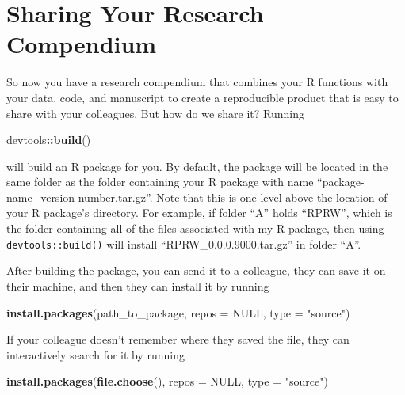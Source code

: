 \documentclass[
]{book}
\newenvironment{Shaded}{\begin{snugshade}}{\end{snugshade}}
\newcommand{\DataTypeTok}[1]{\textcolor[rgb]{0.13,0.29,0.53}{#1}}
\newcommand{\KeywordTok}[1]{\textcolor[rgb]{0.13,0.29,0.53}{\textbf{#1}}}
\newcommand{\NormalTok}[1]{#1}
\newcommand{\OperatorTok}[1]{\textcolor[rgb]{0.81,0.36,0.00}{\textbf{#1}}}
\newcommand{\OtherTok}[1]{\textcolor[rgb]{0.56,0.35,0.01}{#1}}
\newcommand{\StringTok}[1]{\textcolor[rgb]{0.31,0.60,0.02}{#1}}
\begin{document}
\hypertarget{sharing-rc}{%
\section{Sharing Your Research Compendium}\label{sharing-rc}}

So now you have a research compendium that combines your R functions with your data, code, and manuscript to create a reproducible product that is easy to share with your colleagues. But how do we share it? Running

\begin{Shaded}
\begin{Highlighting}[]
\NormalTok{devtools}\OperatorTok{::}\KeywordTok{build}\NormalTok{()}
\end{Highlighting}
\end{Shaded}

will build an R package for you. By default, the package will be located in the same folder as the folder containing your R package with name ``package-name\_version-number.tar.gz''. Note that this is one level above the location of your R package's directory. For example, if folder ``A'' holds ``RPRW'', which is the folder containing all of the files associated with my R package, then using \texttt{devtools::build()} will install ``RPRW\_0.0.0.9000.tar.gz'' in folder ``A''.

After building the package, you can send it to a colleague, they can save it on their machine, and then they can install it by running

\begin{Shaded}
\begin{Highlighting}[]
\KeywordTok{install.packages}\NormalTok{(path_to_package, }\DataTypeTok{repos =} \OtherTok{NULL}\NormalTok{, }\DataTypeTok{type =} \StringTok{"source"}\NormalTok{)}
\end{Highlighting}
\end{Shaded}

If your colleague doesn't remember where they saved the file, they can interactively search for it by running

\begin{Shaded}
\begin{Highlighting}[]
\KeywordTok{install.packages}\NormalTok{(}\KeywordTok{file.choose}\NormalTok{(), }\DataTypeTok{repos =} \OtherTok{NULL}\NormalTok{, }\DataTypeTok{type =} \StringTok{"source"}\NormalTok{)}
\end{Highlighting}
\end{Shaded}
\end{document}
